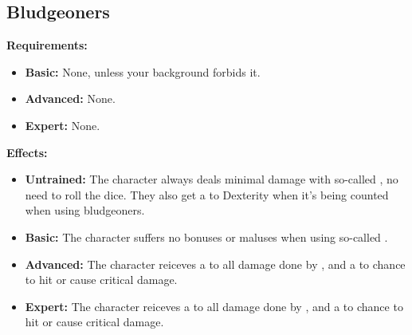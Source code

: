 \subsection{Bludgeoners}
\begin{table}[!ht]
\centering
{}
\end{table}
\textbf{Requirements:}
\begin{itemize}
	\item \textbf{Basic:} None, unless your background forbids it.
	\item \textbf{Advanced:} None.
	\item \textbf{Expert:} None.
\end{itemize}
\textbf{Effects:}
\begin{itemize}
	\item \textbf{Untrained:} The character always deals minimal damage with so-called  , no need to roll the dice. They also get a  to Dexterity when it's being counted when using bludgeoners.
	\item \textbf{Basic:} The character suffers no bonuses or maluses when using so-called  .
	\item \textbf{Advanced:} The character reiceves a  to all damage done by  , and a  to chance to hit or cause critical damage.
	\item \textbf{Expert:} The character reiceves a  to all damage done by  , and a  to chance to hit or cause critical damage.
\end{itemize}\newpage
